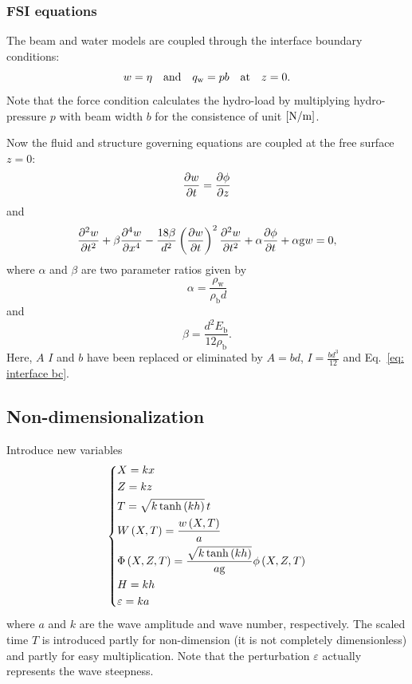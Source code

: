 \subsubsection{FSI equations}
The beam and water models are coupled through the interface boundary conditions:
\begin{equation}
    w = \eta \qq{and} q_\mathrm{w} = p b \qq{at} z = 0.
    \label{eq: interface bc}
\end{equation}
Note that the force condition calculates the hydro-load by multiplying hydro-pressure \ensuremath{p} with beam width \ensuremath{b} for the consistence of unit \ensuremath{\Bkt{\si[per-mode=symbol]{\newton\per\meter}}}.

Now the fluid and structure governing equations are coupled at the free surface \ensuremath{z=0}:
\begin{equation}
    \pdv{w}{t} = \pdv{\phi}{z} 
    \label{eq: FSI kinematic}
\end{equation}
and
\begin{equation}
    \pdv[2]{w}{t} 
    + \beta \pdv[4]{w}{x} 
    - \frac{18\beta}{d^2} \left(\pdv{w}{t}\right)^2\pdv[2]{w}{t}
    + \alpha \pdv{\phi}{t} 
    + \alpha \mathrm{g} w 
    = 0,
    \label{eq: FSI EOM}
\end{equation}
where \ensuremath{\alpha} and \ensuremath{\beta} are two parameter ratios given by 
\begin{equation}
    \alpha = \frac{\rho_\mathrm{w}}{ \rho_\mathrm{b} d }
\end{equation}
and
\begin{equation}
    \beta = \frac{ d^2 E_\mathrm{b} }{ 12 \rho_\mathrm{b} }.
\end{equation}
Here, \ensuremath{A} \ensuremath{I} and \ensuremath{b} have been replaced or eliminated by \ensuremath{A=bd}, \ensuremath{I=\frac{bd^3}{12}} and Eq.~\eqref{eq: interface bc}.


\subsection{Non-dimensionalization}
Introduce new variables
\begin{equation}
    \left\{
    \begin{aligned}
        & X = k x \\
        & Z = k z \\
        & T = \sqrt{ k \tanh\left(kh\right) } \,  t \\
        & W\left(X,T\right) = \frac{w\left(X,T\right)}{a} \\
        & \Phi\left(X,Z,T\right) = \frac{ \sqrt{ k \tanh\left(kh\right) } }{ a \mathrm{g} } \phi\left(X,Z,T\right) \\
        & H = k h \\
        & \varepsilon = k a
    \end{aligned}
    \right.
    \label{eq: nondimensional variables}
\end{equation}
where \ensuremath{a} and \ensuremath{k} are the wave amplitude and wave number, respectively. The scaled time \ensuremath{T} is introduced partly for non-dimension (it is not completely dimensionless) and partly for easy multiplication. Note that the perturbation \ensuremath{\varepsilon} actually represents the wave steepness. 

